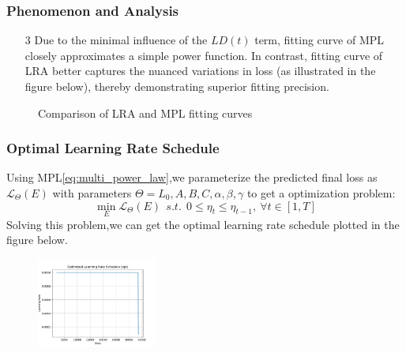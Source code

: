 \documentclass[aspectratio=169]{beamer}
\begin{document}
    \begin{frame}
        \frametitle{Phenomenon and Analysis}
        \begin{enumerate}
            \item[3] Due to the minimal influence of the $LD(t)$ term,
            fitting curve of MPL closely approximates a simple power function.
            In contrast, fitting curve of LRA better captures the
            nuanced variations in loss (as illustrated in the figure
            below), thereby demonstrating superior fitting precision.
        \end{enumerate}
        \begin{figure}
            \centering

            \caption{Comparison of LRA and MPL fitting curves}\label{fig:figure3}
        \end{figure}
    \end{frame}

    \begin{frame}
        \frametitle{Optimal Learning Rate Schedule}
        Using MPL\eqref{eq:multi_power_law},we parameterize the predicted
        final loss as $\mathcal{L}_\Theta(E)$ with parameters $\Theta =
            {L_0,A,B,C,\alpha,\beta,\gamma}$ to get a optimization problem:
        $$
        \min_E \mathcal{L}_\Theta(E) \ \ s.t.
        \ \ 0\le\eta_t\le\eta_{t-1}, \ \forall t\in[1,T]
        $$
        Solving this problem,we can get the optimal learning rate
        schedule plotted in the figure below.
        \begin{figure}
            \centering
            \includegraphics[width=0.35\textwidth]{fig/opt/opt.pdf}
        \end{figure}

    \end{frame}
\end{document}
